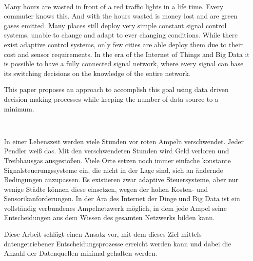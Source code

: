 \vspace{3cm}
\begingroup
{}\\
\endgroup
\vspace{1.5cm}

Many hours are wasted in front of a red traffic lights in a life time. Every commuter knows this. And with the hours wasted is money lost and are green gases emitted. Many places still deploy very simple constant signal control systems, unable to change and adapt to ever changing conditions. While there exist adaptive control systems, only few cities are able deploy them due to their cost and sensor requirements. In the era of the Internet of Things and Big Data it is possible to have a fully connected signal network, where every signal can base its switching decisions on the knowledge of the entire network.

This paper proposes an approach to accomplish this goal using data driven decision making processes while keeping the number of data source to a minimum.


\vspace{1.5cm}
\begingroup
{}\\
\endgroup
\vspace{1.5cm}

In einer Lebenszeit werden viele Stunden vor roten Ampeln verschwendet. Jeder Pendler weiß das. Mit den verschwendeten Stunden wird Geld verloren und Treibhausgas ausgestoßen. Viele Orte setzen noch immer einfache konstante Signalsteuerungssysteme ein, die nicht in der Lage sind, sich an ändernde Bedingungen anzupassen. Es existieren zwar adaptive Steuersysteme, aber nur wenige Städte können diese einsetzen, wegen der hohen Kosten- und Sensorikanforderungen. In der Ära des Internet der Dinge und Big Data ist ein vollständig verbundenes Ampelnetzwerk möglich, in dem jede Ampel seine Entscheidungen aus dem Wissen des gesamten Netzwerks bilden kann.

Diese Arbeit schlägt einen Ansatz vor, mit dem dieses Ziel mittels datengetriebener Entscheidungsprozesse erreicht werden kann und dabei die Anzahl der Datenquellen minimal gehalten werden.

